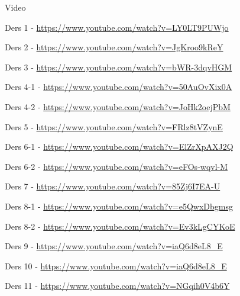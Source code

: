 \documentclass[12pt,fleqn]{article}\usepackage{../../common}
\begin{document}
Video

Ders 1 - \url{https://www.youtube.com/watch?v=LY0LT9PUWjo}

Ders 2 - \url{https://www.youtube.com/watch?v=JgKroo9kReY}

Ders 3 - \url{https://www.youtube.com/watch?v=bWR-3dqvHGM}

Ders 4-1 - \url{https://www.youtube.com/watch?v=50AuOvXix0A}

Ders 4-2 - \url{https://www.youtube.com/watch?v=JoHk2oejPbM}

Ders 5 - \url{https://www.youtube.com/watch?v=FRlz8tVZynE}

Ders 6-1 - \url{https://www.youtube.com/watch?v=ElZrXpAXJ2Q}

Ders 6-2 - \url{https://www.youtube.com/watch?v=eFOs-wqvl-M}

Ders 7 - \url{https://www.youtube.com/watch?v=85Zj6I7EA-U}

Ders 8-1 - \url{https://www.youtube.com/watch?v=e5QwxDbgmsg}

Ders 8-2 - \url{https://www.youtube.com/watch?v=Ev3kLgCYKoE}

Ders 9 - \url{https://www.youtube.com/watch?v=iaQ6d8eL8_E}

Ders 10 - \url{https://www.youtube.com/watch?v=iaQ6d8eL8_E}

Ders 11 - \url{https://www.youtube.com/watch?v=NGqih0V4b6Y}
\end{document}
